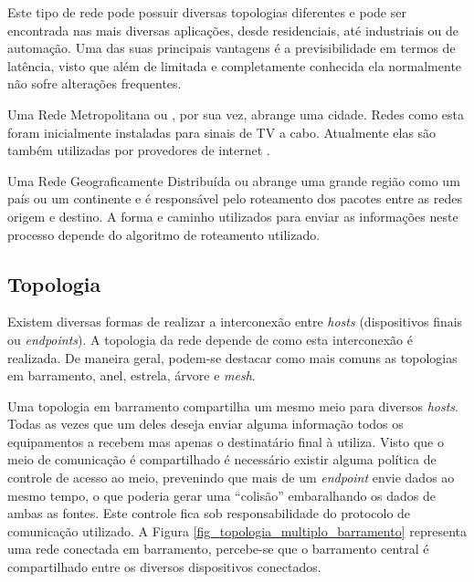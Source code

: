 Este tipo de rede pode possuir diversas topologias diferentes e pode ser encontrada nas mais diversas aplicações, desde residenciais, até industriais ou de automação. Uma das suas principais vantagens é a previsibilidade em termos de latência, visto que além de limitada e completamente conhecida ela normalmente não sofre alterações frequentes.

Uma Rede Metropolitana ou , por sua vez, abrange uma cidade. Redes como esta foram inicialmente instaladas para sinais de TV a cabo. Atualmente elas são também utilizadas por provedores de internet \cite{Book_Tanenbaum2003}.

Uma Rede Geograficamente Distribuída ou  abrange uma grande região como um país ou um continente e é responsável pelo roteamento dos pacotes entre as redes origem e destino. A forma e caminho utilizados para enviar as informações neste processo depende do algoritmo de roteamento utilizado. \cite{Book_Tanenbaum2003}

\subsection{Topologia}
Existem diversas formas de realizar a interconexão entre \emph{hosts} (dispositivos finais ou \emph{endpoints}). A topologia da rede depende de como esta interconexão é realizada. De maneira geral, podem-se destacar como mais comuns as topologias em barramento, anel, estrela, árvore e \emph{mesh}.

Uma topologia em barramento compartilha um mesmo meio para diversos \emph{hosts}. Todas as vezes que um deles deseja enviar alguma informação todos os equipamentos a recebem mas apenas o destinatário final à utiliza. Visto que o meio de comunicação é compartilhado é necessário existir alguma política de controle de acesso ao meio, prevenindo que mais de um \emph{endpoint} envie dados ao mesmo tempo, o que poderia gerar uma ``colisão'' embaralhando os dados de ambas as fontes. Este controle fica sob responsabilidade do protocolo de comunicação utilizado. A Figura \ref{fig_topologia_multiplo_barramento} representa uma rede conectada em barramento, percebe-se que o barramento central é compartilhado entre os diversos dispositivos conectados.


